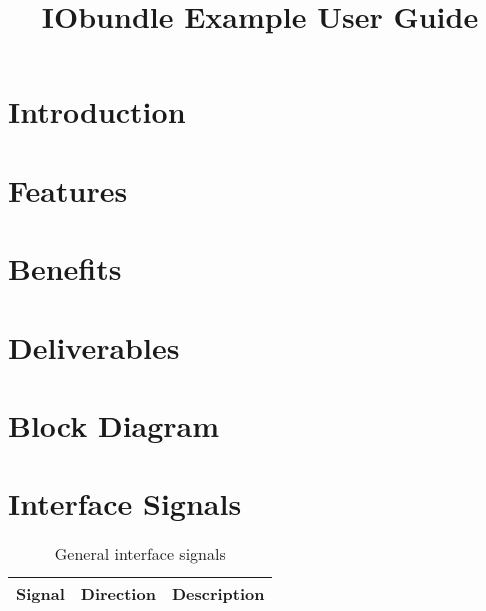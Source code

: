 \documentclass{ug}
\title{IObundle Example User Guide}
\theoremstyle{plain}
\begin{document}
\maketitle
\cleardoublepage
\tableofcontents
\clearpage
\listoftables
\clearpage
\listoffigures
\cleardoublepage

\section{\textcolor[rgb]{0,0,0}{Introduction}}


\section{\textcolor[rgb]{0,0,0}{Features}}


\section{\textcolor[rgb]{0,0,0}{Benefits}}


\section{\textcolor[rgb]{0,0,0}{Deliverables}}


\section*{\textcolor[rgb]{0,0,0}{Block Diagram}}


\section{Interface Signals}

\begin{table}[H]
  \begin{center}
    \begin{tabular}{|l|l|p{8cm}|}
      \hline
      \rowcolor{iob-green}
      \textbf{Signal} & \textbf{Direction} & \textbf{Description} \\
      \hline
      \hline


    \end{tabular}
    \caption{General interface signals}
    \label{tab:is}
  \end{center}
\end{table}
\end{document}
